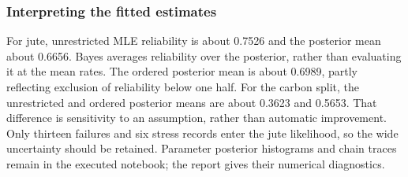 \subsubsection{Interpreting the fitted estimates}
For jute, unrestricted MLE reliability is about 0.7526 and the posterior mean about 0.6656. Bayes averages reliability over the posterior, rather than evaluating it at the mean rates. The ordered posterior mean is about 0.6989, partly reflecting exclusion of reliability below one half. For the carbon split, the unrestricted and ordered posterior means are about 0.3623 and 0.5653. That difference is sensitivity to an assumption, rather than automatic improvement.
Only thirteen failures and six stress records enter the jute likelihood, so the wide uncertainty should be retained. Parameter posterior histograms and chain traces remain in the executed notebook; the report gives their numerical diagnostics.
\FloatBarrier
